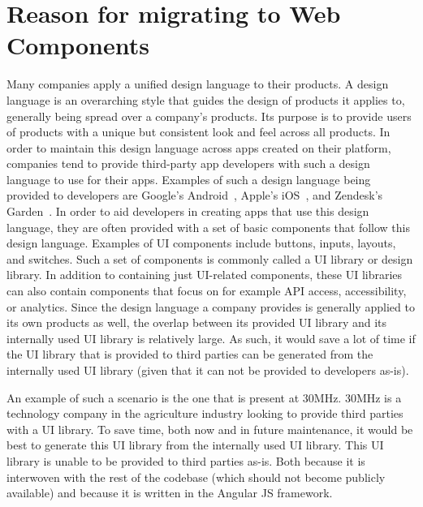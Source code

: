 \section{Reason for migrating to Web Components}
Many companies apply a unified design language to their products. A design language is an overarching style that guides the design of products it applies to, generally being spread over a company's products. Its purpose is to provide users of products with a unique but consistent look and feel across all products. In order to maintain this design language across apps created on their platform, companies tend to provide third-party app developers with such a design language to use for their apps. Examples of such a design language being provided to developers are Google's Android~, Apple's iOS~, and Zendesk's Garden~. In order to aid developers in creating apps that use this design language, they are often provided with a set of basic components that follow this design language. Examples of UI components include buttons, inputs, layouts, and switches. Such a set of components is commonly called a UI library or design library. In addition to containing just UI-related components, these UI libraries can also contain components that focus on for example API access, accessibility, or analytics. Since the design language a company provides is generally applied to its own products as well, the overlap between its provided UI library and its internally used UI library is relatively large. As such, it would save a lot of time if the UI library that is provided to third parties can be generated from the internally used UI library (given that it can not be provided to developers as-is).

An example of such a scenario is the one that is present at 30MHz. 30MHz is a technology company in the agriculture industry looking to provide third parties with a UI library. To save time, both now and in future maintenance, it would be best to generate this UI library from the internally used UI library. This UI library is unable to be provided to third parties as-is. Both because it is interwoven with the rest of the codebase (which should not become publicly available) and because it is written in the Angular JS framework.

